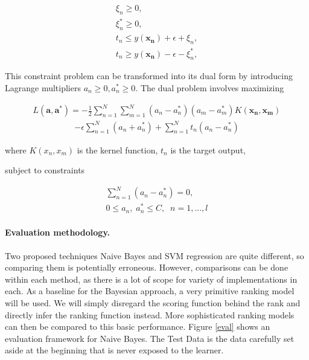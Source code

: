 \documentclass[12pt,twoside,notitlepage]{report}
\begin{document}
\begin{gather} \xi_n\geq 0,\\ \xi_n^*\geq 0,\\ t_n \leq
  y(\mathbf{x_n})+\epsilon+\xi_n,\\ t_n \geq y(\mathbf{x_n})-\epsilon-\xi_n^*,
\end{gather}

This constraint problem can be transformed into its dual form  by introducing
Lagrange multipliers \(a_n \geq 0, a_n^* \geq 0\).  The dual problem involves
maximizing

\begin{gather} \label{eq:maxim}  L(\mathbf{a},\mathbf{a^*}) =
  -\frac{1}{2}\sum_{n=1}^{N}\sum_{m=1}^{N}(a_n-a_n^*)(a_m-a_m^*)K(\mathbf{x_n},\mathbf{x_m})
\end{gather} \begin{gather*} -\epsilon\sum_{n=1}^{N}(a_n+a_n^*) +
  \sum_{n=1}^{N}t_n(a_n-a_n^*) \end{gather*}

where \(K(x_n,x_m) \) is the kernel function, \(t_n\) is the target output,

subject to constraints

\begin{gather}
  \sum_{n=1}^{N}(a_n-a_n^*)=0,\\
  0\leq a_n,\; a_n^*\leq C,\;\;    n=1,...,l 
\end{gather}


\paragraph{Evaluation methodology.}
Two proposed techniques Naive Bayes and SVM regression are quite different, so
comparing them is potentially erroneous. However, comparisons can be done
within each method, as there is a lot of scope for variety of implementations
in each.
As a baseline for the Bayesian approach, a very primitive ranking model will be
used. We will simply disregard the scoring function behind the rank and
directly infer the ranking function instead. More sophisticated ranking models
can then be compared to this basic performance.
Figure \ref{eval} shows an evaluation framework for Naive Bayes.  The Test Data
is the data carefully set aside at the beginning that is never exposed to the
learner. 
\end{document}
